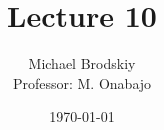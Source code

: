 


\title{Lecture 10}
\date{\today}
\author{Michael Brodskiy\\ \small Professor: M. Onabajo}



\maketitle

